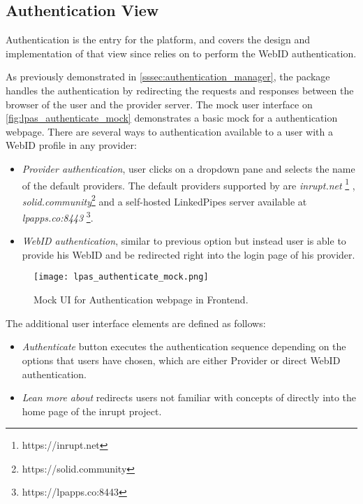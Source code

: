 \subsection{Authentication View}
\label{sssec:architecture_auth_view}

Authentication is the entry for the \lpa{} platform, and \lpas{} covers the design and implementation of that view since \lpa{} relies on \solid{} to perform the WebID authentication. 

As previously demonstrated in \autoref{sssec:authentication_manager}, the \lpas{} package handles the authentication by redirecting the requests and responses between the browser of the user and the \solid{} provider server. The mock user interface on \autoref{fig:lpas_authenticate_mock} demonstrates a basic mock for a authentication webpage. There are several ways to authentication available to a \lpa{} user with a WebID profile in any \solid provider:
\begin{itemize}
    \item \textit{Provider authentication}, user clicks on a dropdown pane and selects the name of the default providers. The default providers supported by \lpas{} are \textit{inrupt.net} \footnote{https://inrupt.net} , \textit{solid.community}\footnote{https://solid.community} and a self-hosted LinkedPipes server available at \textit{lpapps.co:8443} \footnote{https://lpapps.co:8443}.
    \item \textit{WebID authentication}, similar to previous option but instead user is able to provide his WebID and be redirected right into the login page of his provider.
\end{itemize} 

\begin{figure}[h]
\centering
\texttt{[image: lpas\_authenticate\_mock.png]}
\caption{Mock UI for Authentication webpage in \lpa{} Frontend.}
\label{fig:lpas_authenticate_mock}
\end{figure}

The additional user interface elements are defined as follows:

\begin{itemize}
    \item \textit{Authenticate} button executes the authentication sequence depending on the options that users have chosen, which are either Provider or direct WebID authentication.
    \item \textit{Lean more about \solid{}} redirects users not familiar with concepts of \solid{} directly into the home page of the inrupt project.
\end{itemize}
 

